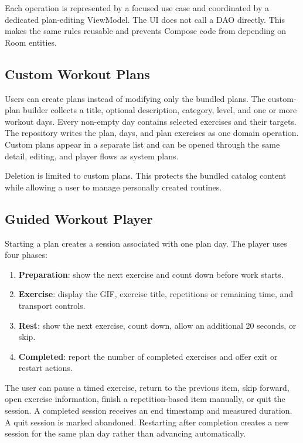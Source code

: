Each operation is represented by a focused use case and coordinated by a dedicated plan-editing ViewModel. The UI does not call a DAO directly. This makes the same rules reusable and prevents Compose code from depending on Room entities.

\subsection{Custom Workout Plans}

Users can create plans instead of modifying only the bundled plans. The custom-plan builder collects a title, optional description, category, level, and one or more workout days. Every non-empty day contains selected exercises and their targets. The repository writes the plan, days, and plan exercises as one domain operation. Custom plans appear in a separate list and can be opened through the same detail, editing, and player flows as system plans.

Deletion is limited to custom plans. This protects the bundled catalog content while allowing a user to manage personally created routines.

\subsection{Guided Workout Player}

Starting a plan creates a session associated with one plan day. The player uses four phases:

\begin{enumerate}
    \item \textbf{Preparation}: show the next exercise and count down before work starts.
    \item \textbf{Exercise}: display the GIF, exercise title, repetitions or remaining time, and transport controls.
    \item \textbf{Rest}: show the next exercise, count down, allow an additional 20 seconds, or skip.
    \item \textbf{Completed}: report the number of completed exercises and offer exit or restart actions.
\end{enumerate}

The user can pause a timed exercise, return to the previous item, skip forward, open exercise information, finish a repetition-based item manually, or quit the session. A completed session receives an end timestamp and measured duration. A quit session is marked abandoned. Restarting after completion creates a new session for the same plan day rather than advancing automatically.

